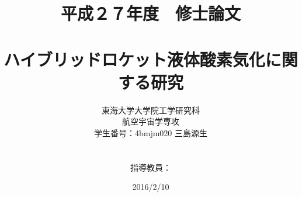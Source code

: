 \documentclass[12pt,oneside, a4j]{jbook}
\begin{document}
\frontmatter
\title{平成２７年度　修士論文  \\ \\ ハイブリッドロケット液体酸素気化に関する研究}
\author{東海大学大学院工学研究科\\航空宇宙学専攻\\学生番号：4bmjm020 三島源生\\ \\ \\指導教員：}
\date{\Large{2016/2/10}}
\maketitle



\tableofcontents
\listoftables
\listoffigures

\clearpage

\mainmatter

\clearpage

\clearpage
%
%
%
\end{document}
